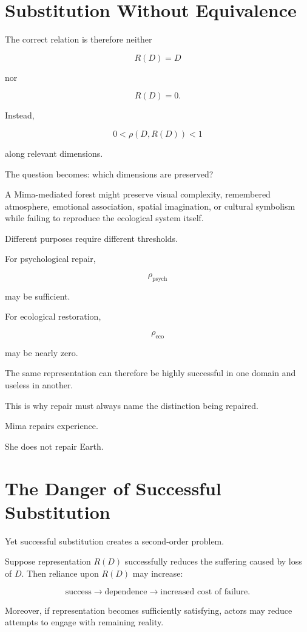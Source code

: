 \documentclass[11pt,oneside]{book}
\theoremstyle{definition}
\theoremstyle{remark}
\begin{document}
\section{Substitution Without Equivalence}

The correct relation is therefore neither

\[
R(D)=D
\]

nor

\[
R(D)=0.
\]

Instead,

\[
0<\rho(D,R(D))<1
\]

along relevant dimensions.

The question becomes: which dimensions are preserved?

A Mima-mediated forest might preserve visual complexity, remembered atmosphere, emotional association, spatial imagination, or cultural symbolism while failing to reproduce the ecological system itself.

Different purposes require different thresholds.

For psychological repair,

\[
\rho_{\mathrm{psych}}
\]

may be sufficient.

For ecological restoration,

\[
\rho_{\mathrm{eco}}
\]

may be nearly zero.

The same representation can therefore be highly successful in one domain and useless in another.

This is why repair must always name the distinction being repaired.

Mima repairs experience.

She does not repair Earth.

\section{The Danger of Successful Substitution}

Yet successful substitution creates a second-order problem.

Suppose representation \(R(D)\) successfully reduces the suffering caused by loss of \(D\). Then reliance upon \(R(D)\) may increase:

\[
\text{success}
\rightarrow
\text{dependence}
\rightarrow
\text{increased cost of failure}.
\]

Moreover, if representation becomes sufficiently satisfying, actors may reduce attempts to engage with remaining reality.
\end{document}
